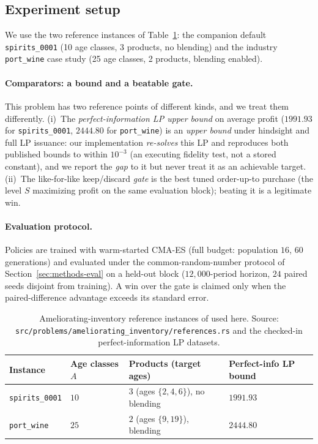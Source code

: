 \subsection{Experiment setup}
\label{sec:amelior-setup}

We use the two reference instances of Table~\ref{tab:amelior-params}: the companion default
\texttt{spirits\_0001} (10 age classes, 3 products, no blending) and the industry \texttt{port\_wine}
case study (25 age classes, 2 products, blending enabled).

\paragraph{Comparators: a bound and a beatable gate.}
This problem has two reference points of different kinds, and we treat them differently. (i)~The
\emph{perfect-information LP upper bound} on average profit ($1991.93$ for \texttt{spirits\_0001},
$2444.80$ for \texttt{port\_wine}) is an \emph{upper bound} under hindsight and full LP issuance: our
implementation \emph{re-solves} this LP and reproduces both published bounds to within $10^{-3}$ (an
executing fidelity test, not a stored constant), and we report the \emph{gap} to it but never treat it
as an achievable target. (ii)~The like-for-like keep/discard \emph{gate} is the best tuned order-up-to
purchase (the level $S$ maximizing profit on the same evaluation block); beating it is a legitimate
win.

\paragraph{Evaluation protocol.}
Policies are trained with warm-started CMA-ES (full budget: population $16$, $60$ generations) and
evaluated under the common-random-number protocol of Section~\ref{sec:methods-eval} on a held-out
block ($12{,}000$-period horizon, $24$ paired seeds disjoint from training). A win over the gate is
claimed only when the paired-difference advantage exceeds its standard error.

\begin{table}[!htbp]
\centering
\small
\caption{Ameliorating-inventory reference instances of \citet{pahrGrunow2025} used here. Source:
\texttt{src/problems/ameliorating\_inventory/references.rs} and the checked-in perfect-information LP
datasets.}
\label{tab:amelior-params}
\begin{tabular}{llll}
\toprule
Instance & Age classes $A$ & Products (target ages) & Perfect-info LP bound \\
\midrule
\texttt{spirits\_0001} & $10$ & $3$ (ages $\{2,4,6\}$), no blending & $1991.93$ \\
\texttt{port\_wine}    & $25$ & $2$ (ages $\{9,19\}$), blending     & $2444.80$ \\
\bottomrule
\end{tabular}
\end{table}
\FloatBarrier

